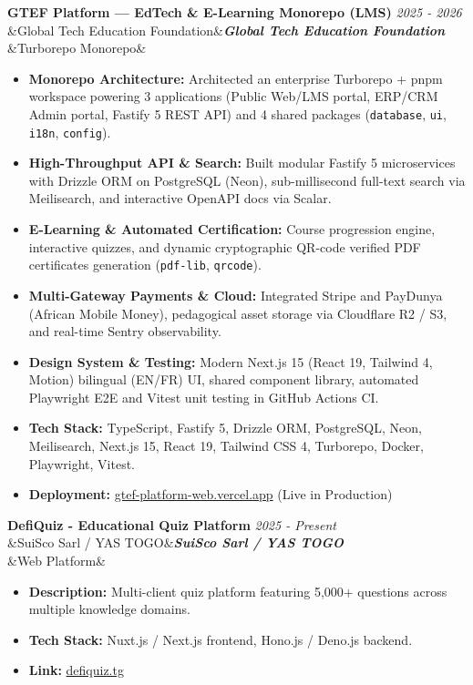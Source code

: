 \documentclass[11pt, a4paper]{article}
\newcommand{\cventry}[4]{%
  \needspace{3\baselineskip}%
  \noindent\textbf{\large #1} \hfill {\small\color{secondary}\textit{#2}}\\[2pt]%
  \ifx&#3&\else\noindent\textbf{\textit{#3}}\\[3pt]\fi
  \ifx&#4&\else\noindent{#4}\fi
  \vspace{6pt}\par
}
\begin{document}
\vspace{4pt}

\cventry{GTEF Platform — EdTech \& E-Learning Monorepo (LMS)}{2025 - 2026}{Global Tech Education Foundation}{Turborepo Monorepo}
\begin{itemize}
  \item \textbf{Monorepo Architecture:} Architected an enterprise Turborepo + pnpm workspace powering 3 applications (Public Web/LMS portal, ERP/CRM Admin portal, Fastify 5 REST API) and 4 shared packages (\texttt{database}, \texttt{ui}, \texttt{i18n}, \texttt{config}).
  \item \textbf{High-Throughput API \& Search:} Built modular Fastify 5 microservices with Drizzle ORM on PostgreSQL (Neon), sub-millisecond full-text search via Meilisearch, and interactive OpenAPI docs via Scalar.
  \item \textbf{E-Learning \& Automated Certification:} Course progression engine, interactive quizzes, and dynamic cryptographic QR-code verified PDF certificates generation (\texttt{pdf-lib}, \texttt{qrcode}).
  \item \textbf{Multi-Gateway Payments \& Cloud:} Integrated Stripe and PayDunya (African Mobile Money), pedagogical asset storage via Cloudflare R2 / S3, and real-time Sentry observability.
  \item \textbf{Design System \& Testing:} Modern Next.js 15 (React 19, Tailwind 4, Motion) bilingual (EN/FR) UI, shared component library, automated Playwright E2E and Vitest unit testing in GitHub Actions CI.
  \item \textbf{Tech Stack:} TypeScript, Fastify 5, Drizzle ORM, PostgreSQL, Neon, Meilisearch, Next.js 15, React 19, Tailwind CSS 4, Turborepo, Docker, Playwright, Vitest.
  \item \textbf{Deployment:} \href{https://gtef-platform-web.vercel.app/}{gtef-platform-web.vercel.app} (Live in Production)
\end{itemize}

\vspace{4pt}

\cventry{DefiQuiz - Educational Quiz Platform}{2025 - Present}{SuiSco Sarl / YAS TOGO}{Web Platform}
\begin{itemize}
  \item \textbf{Description:} Multi-client quiz platform featuring 5,000+ questions across multiple knowledge domains.
  \item \textbf{Tech Stack:} Nuxt.js / Next.js frontend, Hono.js / Deno.js backend.
  \item \textbf{Link:} \href{https://defiquiz.tg/}{defiquiz.tg}
\end{itemize}
\end{document}
